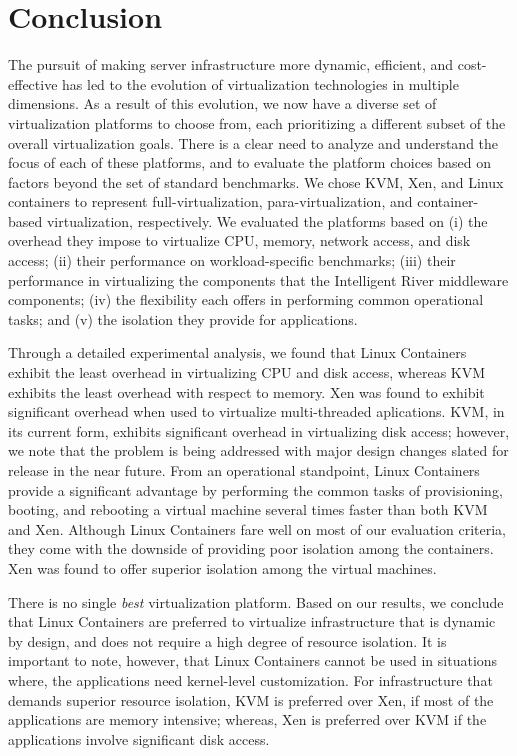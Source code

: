 \chapter{Conclusion}

The pursuit of making server infrastructure more dynamic, efficient, and cost-effective has led to the evolution of virtualization technologies in multiple dimensions. As a result of this evolution, we now have a diverse set of virtualization platforms to choose from, each prioritizing a different subset of the overall virtualization goals. There is a clear need to analyze and understand the focus of each of these platforms, and to evaluate the platform choices based on factors beyond the set of standard benchmarks. We chose KVM, Xen, and Linux containers to represent full-virtualization, para-virtualization, and container-based virtualization, respectively. We evaluated the platforms based on (i) the overhead they impose to virtualize CPU, memory, network access, and disk access; (ii) their performance on workload-specific benchmarks; (iii) their performance in virtualizing the components that the Intelligent River\textsuperscript{\textregistered} middleware components; (iv) the flexibility each offers in performing common operational tasks; and (v) the isolation they provide for applications.

Through a detailed experimental analysis, we found that Linux Containers exhibit the least overhead in virtualizing CPU and disk access, whereas KVM exhibits the least overhead with respect to memory. Xen was found to exhibit significant overhead when used to virtualize multi-threaded aplications. KVM, in its current form, exhibits significant overhead in virtualizing disk access; however, we note that the problem is being addressed with major design changes slated for release in the near future. From an operational standpoint, Linux Containers provide a significant advantage by performing the common tasks of provisioning, booting, and rebooting a virtual machine several times faster than both KVM and Xen. Although Linux Containers fare well on most of our evaluation criteria, they come with the downside of providing poor isolation among the containers. Xen was found to offer superior isolation among the virtual machines.

There is no single \emph{best} virtualization platform. Based on our results, we conclude that Linux Containers are preferred to virtualize infrastructure that is dynamic by design, and does not require a high degree of resource isolation. It is important to note, however, that Linux Containers cannot be used in situations where, the applications need kernel-level customization. For infrastructure that demands superior resource isolation, KVM is preferred over Xen, if most of the applications are memory intensive; whereas, Xen is preferred over KVM if the applications involve significant disk access.
